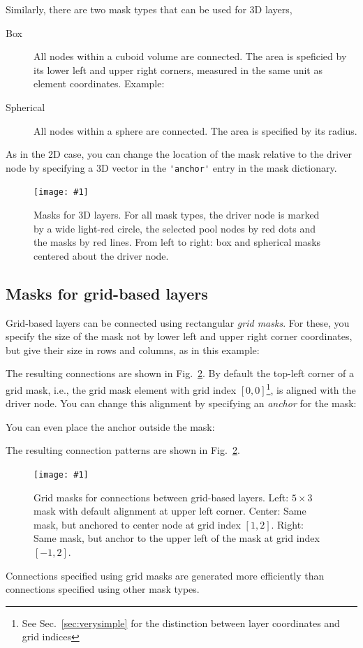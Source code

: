 \documentclass[a4paper,12pt]{report}
\newcommand{\scriptfig}[4]{%
\begin{figure}
\centerline{\texttt{[image: \#1]}}
\caption[#3]{#4}
\label{fig:#1}
\end{figure}%
}
\begin{document}
Similarly, there are two mask types that can be used for 3D layers,
\begin{description}
\item[Box] All nodes within a cuboid volume are connected. The
  area is speficied by its lower left and upper right corners, measured in
  the same unit as element coordinates. Example:
  
\item[Spherical] All nodes within a sphere are
  connected.  The area is specified by its radius.

\end{description}
As in the 2D case, you can change the location of the mask relative to the
driver node by specifying a 3D vector in the
\lstinline!'anchor'! entry in the mask dictionary.

\scriptfig{conn_3d}{0.9}{Masks for 3D layers}%
{Masks for 3D layers. For all mask types, the driver node is
  marked by a wide light-red circle, the selected pool nodes by red
  dots and the masks by red lines. From left to right:
  box and spherical masks centered about the driver node.}


\subsection{Masks for grid-based layers}\label{sec:grid_masks}

Grid-based layers can be connected using rectangular \emph{grid
  masks}. For these, you specify the size of the mask
not by lower left and upper right corner coordinates, but give their
size in rows and columns, as in this example:
%

% 
The resulting connections are shown in Fig.~\ref{fig:conn3}. By
default the top-left corner of a grid mask, i.e., the grid mask
element with grid index $[0,0]$\footnote{See Sec.~\ref{sec:verysimple} for the
distinction between layer coordinates and grid indices}, is aligned
with the driver node. You can change this alignment by specifying an 
 \emph{anchor} for the mask:
%

% 
You can even place the anchor outside the mask:
%

% 
The resulting connection patterns are shown in Fig.~\ref{fig:conn3}.
%
\scriptfig{conn3}{0.9}{Grid masks}%
{Grid masks for connections between grid-based layers.
Left: $5\times3$ mask with default alignment at upper left corner.
Center: Same mask, but anchored to center node at grid index $[1,2]$.
Right: Same mask, but anchor to the upper left of the mask at grid
index $[-1,2]$.}
Connections specified using grid masks are generated more efficiently
than connections specified using other mask types.
\end{document}
